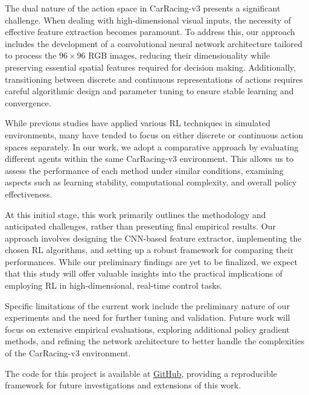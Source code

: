 \documentclass[../CSC_52081_EP.tex]{subfiles}
\begin{document}
The dual nature of the action space in CarRacing-v3 presents a significant challenge. When dealing with high-dimensional visual inputs, the necessity of effective feature extraction becomes paramount. To address this, our approach includes the development of a convolutional neural network architecture tailored to process the \(96\times96\) RGB images, reducing their dimensionality while preserving essential spatial features required for decision making. Additionally, transitioning between discrete and continuous representations of actions requires careful algorithmic design and parameter tuning to ensure stable learning and convergence.

While previous studies have applied various RL techniques in simulated environments, many have tended to focus on either discrete or continuous action spaces separately. In our work, we adopt a comparative approach by evaluating different agents within the same CarRacing-v3 environment. This allows us to assess the performance of each method under similar conditions, examining aspects such as learning stability, computational complexity, and overall policy effectiveness.

At this initial stage, this work primarily outlines the methodology and anticipated challenges, rather than presenting final empirical results. Our approach involves designing the CNN-based feature extractor, implementing the chosen RL algorithms, and setting up a robust framework for comparing their performances. While our preliminary findings are yet to be finalized, we expect that this study will offer valuable insights into the practical implications of employing RL in high-dimensional, real-time control tasks.

Specific limitations of the current work include the preliminary nature of our experiments and the need for further tuning and validation. Future work will focus on extensive empirical evaluations, exploring additional policy gradient methods, and refining the network architecture to better handle the complexities of the CarRacing-v3 environment.

The code for this project is available at \href{https://github.com/tr0fin0/ensta_CSC_52081_EP_project}{GitHub}, providing a reproducible framework for future investigations and extensions of this work.
\end{document}
